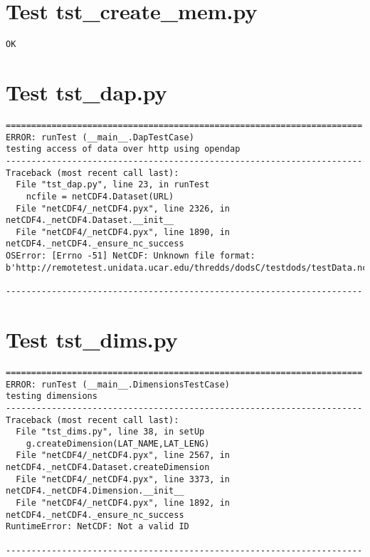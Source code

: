 \section{Test tst\_create\_mem.py}

\begin{verbatim}
OK
\end{verbatim}

\section{Test tst\_dap.py}

\begin{verbatim}
======================================================================
ERROR: runTest (__main__.DapTestCase)
testing access of data over http using opendap
----------------------------------------------------------------------
Traceback (most recent call last):
  File "tst_dap.py", line 23, in runTest
    ncfile = netCDF4.Dataset(URL)
  File "netCDF4/_netCDF4.pyx", line 2326, in netCDF4._netCDF4.Dataset.__init__
  File "netCDF4/_netCDF4.pyx", line 1890, in netCDF4._netCDF4._ensure_nc_success
OSError: [Errno -51] NetCDF: Unknown file format: b'http://remotetest.unidata.ucar.edu/thredds/dodsC/testdods/testData.nc'

----------------------------------------------------------------------
\end{verbatim}

\section{Test tst\_dims.py}

\begin{verbatim}
======================================================================
ERROR: runTest (__main__.DimensionsTestCase)
testing dimensions
----------------------------------------------------------------------
Traceback (most recent call last):
  File "tst_dims.py", line 38, in setUp
    g.createDimension(LAT_NAME,LAT_LENG)
  File "netCDF4/_netCDF4.pyx", line 2567, in netCDF4._netCDF4.Dataset.createDimension
  File "netCDF4/_netCDF4.pyx", line 3373, in netCDF4._netCDF4.Dimension.__init__
  File "netCDF4/_netCDF4.pyx", line 1892, in netCDF4._netCDF4._ensure_nc_success
RuntimeError: NetCDF: Not a valid ID

----------------------------------------------------------------------
\end{verbatim}

